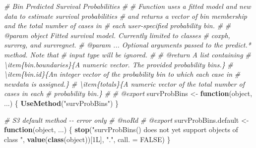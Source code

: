 \documentclass[
]{book}
\newenvironment{Shaded}{\begin{snugshade}}{\end{snugshade}}
\newcommand{\AttributeTok}[1]{\textcolor[rgb]{0.13,0.29,0.53}{#1}}
\newcommand{\CommentTok}[1]{\textcolor[rgb]{0.56,0.35,0.01}{\textit{#1}}}
\newcommand{\ConstantTok}[1]{\textcolor[rgb]{0.56,0.35,0.01}{#1}}
\newcommand{\ControlFlowTok}[1]{\textcolor[rgb]{0.13,0.29,0.53}{\textbf{#1}}}
\newcommand{\FunctionTok}[1]{\textcolor[rgb]{0.13,0.29,0.53}{\textbf{#1}}}
\newcommand{\NormalTok}[1]{#1}
\newcommand{\OtherTok}[1]{\textcolor[rgb]{0.56,0.35,0.01}{#1}}
\newcommand{\StringTok}[1]{\textcolor[rgb]{0.31,0.60,0.02}{#1}}
\begin{document}
\begin{Shaded}
\begin{Highlighting}[]
\CommentTok{\#\textquotesingle{} Bin Predicted Survival Probabilities}
\CommentTok{\#\textquotesingle{} }
\CommentTok{\#\textquotesingle{} Function uses a fitted model and new data to estimate survival probabilities}
\CommentTok{\#\textquotesingle{}   and returns a vector of bin membership and the total number of cases in}
\CommentTok{\#\textquotesingle{}   each user{-}specified probability bin.}
\CommentTok{\#\textquotesingle{}   }
\CommentTok{\#\textquotesingle{} @param object Fitted survival model. Currently limited to classes}
\CommentTok{\#\textquotesingle{}   \textasciigrave{}coxph\textasciigrave{}, \textasciigrave{}survreg\textasciigrave{}, and \textasciigrave{}survregnet\textasciigrave{}.}
\CommentTok{\#\textquotesingle{} @param ... Optional arguments passed to the \textasciigrave{}predict.*\textasciigrave{} method. Note that}
\CommentTok{\#\textquotesingle{}   input \textasciigrave{}type\textasciigrave{} will be ignored.}
\CommentTok{\#\textquotesingle{} }
\CommentTok{\#\textquotesingle{} @return A list containing}
\CommentTok{\#\textquotesingle{} \textbackslash{}item\{bin.boundaries\}\{A numeric vector. The provided probability bins.\}}
\CommentTok{\#\textquotesingle{} \textbackslash{}item\{bin.id\}\{An integer vector of the probability bin to which each case in }
\CommentTok{\#\textquotesingle{}   \textasciigrave{}newdata\textasciigrave{} is assigned.\}}
\CommentTok{\#\textquotesingle{} \textbackslash{}item\{totals\}\{A numeric vector of the total number of cases in each }
\CommentTok{\#\textquotesingle{}   probability bin.\}}
\CommentTok{\#\textquotesingle{} }
\CommentTok{\#\textquotesingle{} @export}
\NormalTok{survProbBins }\OtherTok{\textless{}{-}} \ControlFlowTok{function}\NormalTok{(object, ...) \{ }\FunctionTok{UseMethod}\NormalTok{(}\StringTok{"survProbBins"}\NormalTok{) \}}

\CommentTok{\#\textquotesingle{} S3 default method {-}{-} error only}
\CommentTok{\#\textquotesingle{} @noRd}
\CommentTok{\#\textquotesingle{} @export}
\NormalTok{survProbBins.default }\OtherTok{\textless{}{-}} \ControlFlowTok{function}\NormalTok{(object, ...) \{}
  \FunctionTok{stop}\NormalTok{(}\StringTok{"\textasciigrave{}survProbBins()\textasciigrave{} does not yet support objects of class "}\NormalTok{,}
       \FunctionTok{value}\NormalTok{(}\FunctionTok{class}\NormalTok{(object))[1L], }\StringTok{"."}\NormalTok{, }\AttributeTok{call. =} \ConstantTok{FALSE}\NormalTok{)}
\NormalTok{\}}


\end{Highlighting}
\end{Shaded}
\end{document}

